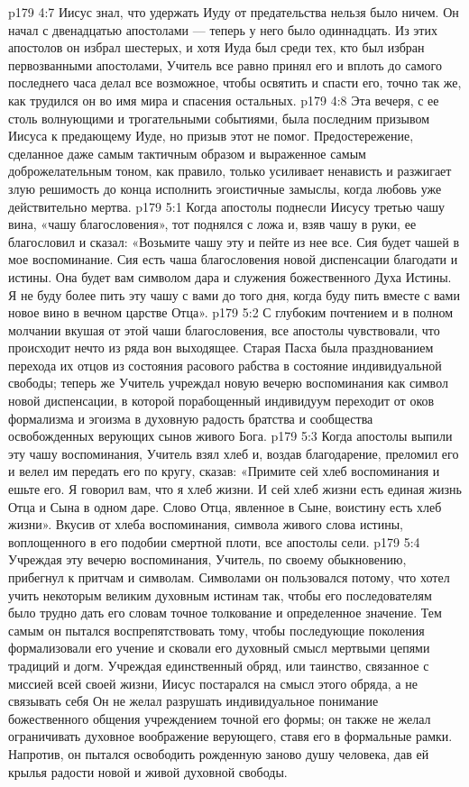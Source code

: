 \vs p179 4:7 \pc Иисус знал, что удержать Иуду от предательства нельзя было ничем. Он начал с двенадцатью апостолами --- теперь у него было одиннадцать. Из этих апостолов он избрал шестерых, и хотя Иуда был среди тех, кто был избран первозванными апостолами, Учитель все равно принял его и вплоть до самого последнего часа делал все возможное, чтобы освятить и спасти его, точно так же, как трудился он во имя мира и спасения остальных.
\vs p179 4:8 Эта вечеря, с ее столь волнующими и трогательными событиями, была последним призывом Иисуса к предающему Иуде, но призыв этот не помог. Предостережение, сделанное даже самым тактичным образом и выраженное самым доброжелательным тоном, как правило, только усиливает ненависть и разжигает злую решимость до конца исполнить эгоистичные замыслы, когда любовь уже действительно мертва.
\vs p179 5:1 Когда апостолы поднесли Иисусу третью чашу вина, «чашу благословения», тот поднялся с ложа и, взяв чашу в руки, ее благословил и сказал: «Возьмите чашу эту и пейте из нее все. Сия будет чашей в мое воспоминание. Сия есть чаша благословения новой диспенсации благодати и истины. Она будет вам символом дара и служения божественного Духа Истины. Я не буду более пить эту чашу с вами до того дня, когда буду пить вместе с вами новое вино в вечном царстве Отца».
\vs p179 5:2 С глубоким почтением и в полном молчании вкушая от этой чаши благословения, все апостолы чувствовали, что происходит нечто из ряда вон выходящее. Старая Пасха была празднованием перехода их отцов из состояния расового рабства в состояние индивидуальной свободы; теперь же Учитель учреждал новую вечерю воспоминания как символ новой диспенсации, в которой порабощенный индивидуум переходит от оков формализма и эгоизма в духовную радость братства и сообщества освобожденных верующих сынов живого Бога.
\vs p179 5:3 Когда апостолы выпили эту чашу воспоминания, Учитель взял хлеб и, воздав благодарение, преломил его и велел им передать его по кругу, сказав: «Примите сей хлеб воспоминания и ешьте его. Я говорил вам, что я хлеб жизни. И сей хлеб жизни есть единая жизнь Отца и Сына в одном даре. Слово Отца, явленное в Сыне, воистину есть хлеб жизни». Вкусив от хлеба воспоминания, символа живого слова истины, воплощенного в его подобии смертной плоти, все апостолы сели.
\vs p179 5:4 \pc Учреждая эту вечерю воспоминания, Учитель, по своему обыкновению, прибегнул к притчам и символам. Символами он пользовался потому, что хотел учить некоторым великим духовным истинам так, чтобы его последователям было трудно дать его словам точное толкование и определенное значение. Тем самым он пытался воспрепятствовать тому, чтобы последующие поколения формализовали его учение и сковали его духовный смысл мертвыми цепями традиций и догм. Учреждая единственный обряд, или таинство, связанное с миссией всей своей жизни, Иисус постарался  на смысл этого обряда, а не связывать себя  Он не желал разрушать индивидуальное понимание божественного общения учреждением точной его формы; он также не желал ограничивать духовное воображение верующего, ставя его в формальные рамки. Напротив, он пытался освободить рожденную заново душу человека, дав ей крылья радости новой и живой духовной свободы.
